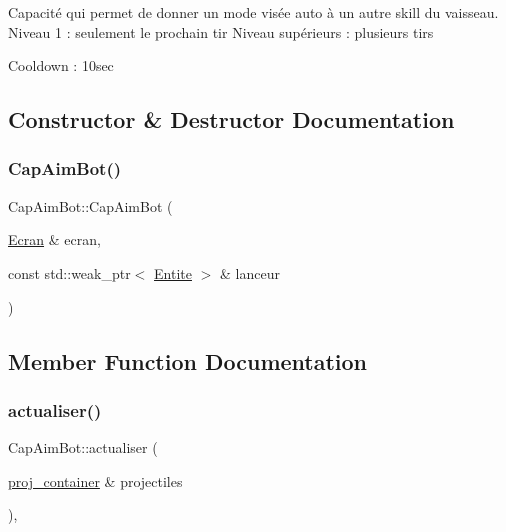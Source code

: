 Capacité qui permet de donner un mode visée auto à un autre skill du vaisseau. Niveau 1 \+: seulement le prochain tir Niveau supérieurs \+: plusieurs tirs

Cooldown \+: 10sec 

\subsection{Constructor \& Destructor Documentation}
\mbox{\label{class_cap_aim_bot_ab55c473ea892d3d5a9e94f8e54282db8}} 
\subsubsection{\texorpdfstring{Cap\+Aim\+Bot()}{CapAimBot()}}
{\footnotesize\ttfamily Cap\+Aim\+Bot\+::\+Cap\+Aim\+Bot (\begin{DoxyParamCaption}\item[{\mbox{\hyperlink{class_ecran}{Ecran}} \&}]{ecran,  }\item[{const std\+::weak\+\_\+ptr$<$ \mbox{\hyperlink{class_entite}{Entite}} $>$ \&}]{lanceur }\end{DoxyParamCaption})\hspace{0.3cm}{\ttfamily [explicit]}}



\subsection{Member Function Documentation}
\mbox{\label{class_cap_aim_bot_a68cc63c8bb28a33989db721c1ed4674d}} 
\subsubsection{\texorpdfstring{actualiser()}{actualiser()}}
{\footnotesize\ttfamily Cap\+Aim\+Bot\+::actualiser (\begin{DoxyParamCaption}\item[{\mbox{\hyperlink{def__type_8h_a87980cd8ee9533e561a73e8bbc728188}{proj\+\_\+container}} \&}]{projectiles }\end{DoxyParamCaption})\hspace{0.3cm}{\ttfamily [override]}, {\ttfamily [virtual]}}




